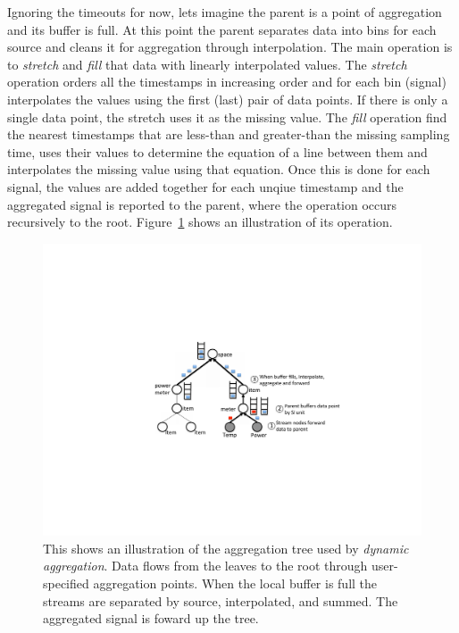 Ignoring the timeouts for now, lets imagine the parent is a point of aggregation and its buffer is full.  At this point
the parent separates data into bins for each source and cleans it for aggregation through interpolation.  The main
operation is to \emph{stretch} and \emph{fill} that data with linearly interpolated values.  The \emph{stretch}
operation orders all the timestamps in increasing order and for each bin (signal) interpolates the values using the
first (last) pair of data points.  If there is only a single data point, the stretch uses it as the missing value.
The \emph{fill} operation find the nearest timestamps that are less-than and greater-than the missing sampling time, 
uses their values to determine the equation of a line between them and interpolates the missing value using that equation.
Once this is done for each signal, the values are added together for each unqiue timestamp and the aggregated
signal is reported to the parent, where the operation occurs recursively to the root.
Figure~\ref{fig:aggtree} shows an illustration of its operation.  



\begin{figure}[htb!]
\begin{center}
\includegraphics[scale=0.6]{figs/aggtree}
\caption{This shows an illustration of the aggregation tree used by \emph{dynamic aggregation}.  Data flows from 
the leaves to the root through user-specified aggregation points.  When the local buffer is full the streams
are separated by source, interpolated, and summed.  The aggregated signal is foward up the tree.}
\label{fig:aggtree}
\end{center}
\end{figure}

